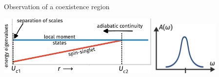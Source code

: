 \documentclass[9pt,aspectratio=169]{beamer}
\begin{document}
\begin{frame}{Observation of a coexistence region}
{\begin{center}
{\includegraphics[width=0.6\textwidth]{coexistence-explain3.pdf}
\hspace*{\fill}
\includegraphics[width=0.25\textwidth]{sf-1.pdf}
}
\end{center}
}
\end{frame}
\end{document}
